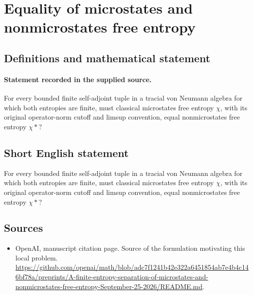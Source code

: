 \documentclass[11pt]{article}
\begin{document}
\section*{Equality of microstates and nonmicrostates free entropy}\label{30007305}
\subsection{Definitions and mathematical statement}
\paragraph{Statement recorded in the supplied source.}
For every bounded finite self-adjoint tuple in a tracial von Neumann algebra for which both entropies are finite, must classical microstates free entropy $\chi $, with its original operator-norm cutoff and limsup convention, equal nonmicrostates free entropy $\chi *$?
\subsection{Short English statement}
For every bounded finite self-adjoint tuple in a tracial von Neumann algebra for which both entropies are finite, must classical microstates free entropy $\chi $, with its original operator-norm cutoff and limsup convention, equal nonmicrostates free entropy $\chi *$?
\subsection{Sources}
\begin{itemize}
\item[S1] OpenAI, manuscript citation page. Source of the formulation motivating this local problem.
\url{https://github.com/openai/math/blob/adc7f1241b42e322a6451854ab7e4b4c146bf78a/preprints/A-finite-entropy-separation-of-microstates-and-nonmicrostates-free-entropy-September-25-2026/README.md}.
\end{itemize}
\end{document}
